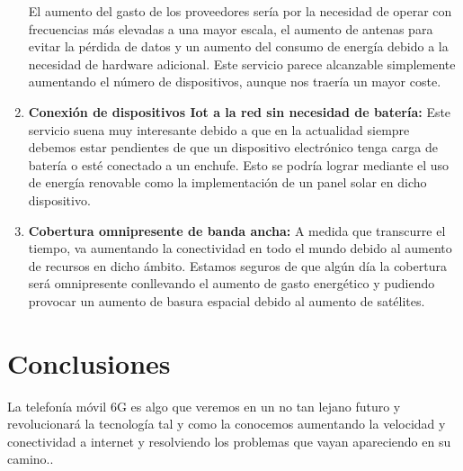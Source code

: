 \begin{enumerate}
El aumento del gasto de los proveedores sería por la necesidad de operar con frecuencias más elevadas a una mayor escala, el aumento de antenas para evitar la pérdida de datos y un aumento del consumo de energía debido a la necesidad de hardware adicional. Este servicio parece alcanzable simplemente aumentando el número de dispositivos, aunque nos traería un mayor coste.
\item {\bfseries Conexión de dispositivos Iot a la red sin necesidad de batería:  }
Este servicio suena muy interesante debido a que en la actualidad siempre debemos estar pendientes de que un dispositivo electrónico tenga carga de batería o esté conectado a un enchufe. Esto se podría lograr mediante el uso de energía renovable como la implementación de un panel solar en dicho dispositivo.
\item {\bfseries Cobertura omnipresente de banda ancha:  }
A medida que transcurre el tiempo, va aumentando la conectividad en todo el mundo debido al aumento de recursos en dicho ámbito. Estamos seguros de que algún día la cobertura será omnipresente conllevando el aumento de gasto energético y pudiendo provocar un aumento de basura espacial debido al aumento de satélites.
\end{enumerate}

\section{Conclusiones}
\label{sec:conclusiones}
La telefonía móvil 6G es algo que veremos en un no tan lejano futuro y revolucionará la tecnología tal y como la conocemos aumentando la velocidad y conectividad a internet y resolviendo los problemas que vayan apareciendo en su camino.\cite{AMI}.

          





